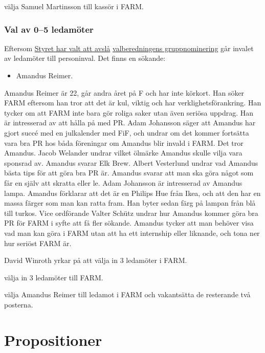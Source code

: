 \documentclass[hidelinks]{sektionsmote} %
\begin{document}
\begin{beslut}
  \item välja Samuel Martinsson till kassör i FARM.
\end{beslut}

\subsubsection{Val av 0--5 ledamöter}
Eftersom \hyperlink{bilagor/nomfarm-avslag.pdf.1}{Styret har valt att avslå} \hyperlink{bilagor/nomfarm.pdf.1}{valberedningens gruppnominering} går invalet av ledamöter till personinval.
Det finns en sökande:
\begin{itemize}
    \item Amandus Reimer.
\end{itemize}

Amandus Reimer är 22, går andra året på F och har inte körkort.
Han söker FARM eftersom han tror att det är kul, viktig och har verklighetsförankring.
Han tycker om att FARM inte bara gör roliga saker utan även seriösa uppdrag.
Han är intresserad av att hålla på med PR.
Adam Johansson säger att Amandus har gjort succé med en julkalender med FiF, och undrar om det kommer fortsätta vara bra PR hos båda föreningar om Amandus blir invald i FARM.
Det tror Amandus.
Jacob Welander undrar vilket ölmärke Amandus skulle vilja vara sponsrad av.
Amandus svarar Elk Brew.
Albert Vesterlund undrar vad Amandus bästa tips för att göra bra PR är.
Amandus svarar att man ska göra något som får en själv att skratta eller le.
Adam Johansson är intresserad av Amandus lampa.
Amandus förklarar att det är en Philips Hue från Ikea, och att den har en massa färger som man kan ratta fram.
Han byter sedan färg på lampan från blå till turkos.
Vice ordförande Valter Schütz undrar hur Amandus kommer göra bra PR för FARM i syfte att få fler sökande.
Amandus tycker att man behöver visa vad man kan göra i FARM utan att ha ett internship eller liknande, och tona ner hur seriöst FARM är.

David Winroth yrkar på att välja in 3 ledamöter i FARM.

\begin{beslut}
  \item välja in 3 ledamöter till FARM.
  \item välja Amandus Reimer till ledamot i FARM och vakantsätta de resterande två posterna.
\end{beslut}


\section{Propositioner}
\end{document}
